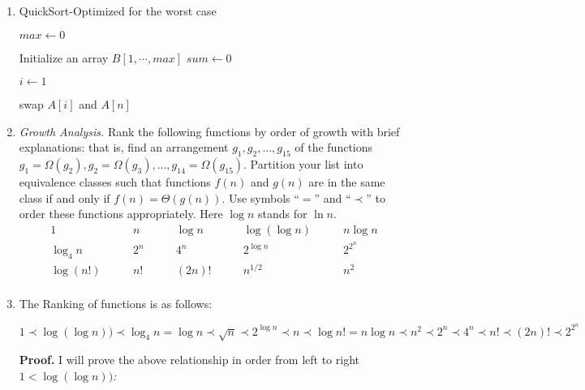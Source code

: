 \documentclass[12pt,a4paper]{article}
\makeatletter
\newtheorem*{solution}{Solution}
\theoremstyle{definition}
\renewenvironment{solution}[1][Solution] {\par\pushQED{\qed}\normalfont\topsep6\p@\@plus6\p@\relax\trivlist\item[\hskip\labelsep\bfseries#1\@addpunct{.}]\ignorespaces}{\popQED\endtrivlist\@endpefalse} \makeatother
\makeatother
\begin{document}
\begin{enumerate}
\begin{solution}
	
    \begin{algorithm}[H]
		
		\BlankLine
		\caption{QuickSort-Optimized for the worst case}\label{Alg-quicksort-optimized}
		
		
		$max\leftarrow 0$\;
		\BlankLine
		
		Initialize an array $B[1,\cdots,max]$\;
		\BlankLine
		$sum\leftarrow 0$\;
		\BlankLine
		
		$i \leftarrow 1$\;
		
		swap $A[i]$ and $A[n]$\;
	\end{algorithm}
    \end{solution}

\item \textit{Growth Analysis.} Rank the following functions by order of growth with brief explanations: that is, find an arrangement $g_1, g_2, \ldots , g_{15}$ of the functions $g_1 = \Omega(g_2), g_2 = \Omega(g_3), \ldots, g_{14} = \Omega(g_{15})$.  Partition your list into equivalence classes such that functions $f(n)$ and $g(n)$ are in the same class if and only if $f(n) = \Theta(g(n))$. Use symbols ``$=$'' and ``$\prec$'' to order these functions appropriately. Here $\log n$ stands for $\ln n$.
$$
\begin{array}{ccccc}
	1 \quad & \quad n \quad & \quad \log n \quad & \quad \log (\log n) \quad & \quad n \log n \\
	\log_4 n \quad & \quad 2^n \quad & \quad 4^n \quad & \quad 2^{\log n} \quad & \quad 2^{2^n} \\
	\log (n!) \quad & \quad n! \quad & \quad (2n)! \quad & \quad  n^{1/2} \quad & \quad n^2 \\
\end{array}
$$
	
 	\begin{solution}
	The Ranking of functions is as follows:
	\begin{small}
	$$1 \prec \log (\log n)) \prec \log_4 n = \log n \prec 	\sqrt{n} \prec 2^{\log n} \prec n \prec \log n! = n\log n \prec n^2 	 \prec 2^n \prec 4^n \prec n! \prec 		(2n)! 	\prec 2^{2^n}$$
	\end{small}    
    \textbf{Proof.} I will prove the above relationship in order from left to right \\
    \textit{$1<\log (\log n))$:}
    

\end{solution}
\end{enumerate}
\end{document}
